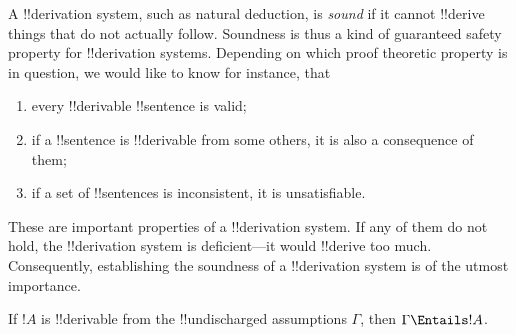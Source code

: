 \documentclass[../../include/open-logic-section]{subfiles}
\begin{document}

\begin{explain}
A !!{derivation} system, such as natural deduction, is \emph{sound}
if it cannot !!{derive} things that do not actually follow.  Soundness is
thus a kind of guaranteed safety property for !!{derivation} systems.
Depending on which proof theoretic property is in question, we would
like to know for instance, that
\begin{enumerate}
\item every !!{derivable} !!{sentence} is valid;
\item if a !!{sentence} is !!{derivable} from some others, it is also a
  consequence of them;
\item if a set of !!{sentence}s is inconsistent, it is unsatisfiable.
\end{enumerate}
These are important properties of a !!{derivation} system. If any of
them do not hold, the !!{derivation} system is deficient---it would
!!{derive} too much.  Consequently, establishing the soundness of a
!!{derivation} system is of the utmost importance.
\end{explain}

\begin{thm}[Soundness]
If $!A$ is !!{derivable} from the !!{undischarged} assumptions
$\Gamma$, then $\Gamma \Entails !A$.
\end{thm}
\end{document}
